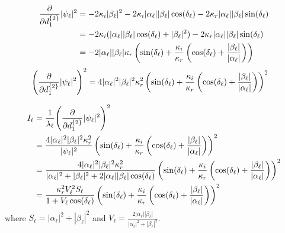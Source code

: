 \documentclass[12pt]{article}
\begin{document}
\begin{align*}
    \pdv{d^{\{2\}}_1} |\psi_\ell|^2 &= 
    -2\kappa_i |\beta_\ell|^2 
    - 2\kappa_i|\alpha_\ell||\beta_\ell|\cos(\delta_\ell) 
    - 2\kappa_r |\alpha_\ell||\beta_\ell|\sin(\delta_\ell)\\
    &= -2\kappa_i(|\alpha_\ell||\beta_\ell|\cos(\delta_\ell) + |\beta_\ell|^2) 
    - 2\kappa_r |\alpha_\ell||\beta_\ell|\sin(\delta_\ell)\\
    &= -2|\alpha_\ell||\beta_\ell|\kappa_r \left(
        \sin(\delta_\ell) + \frac{\kappa_i}{\kappa_r} \left(\cos(\delta_\ell) + \frac{|\beta_\ell|}{|\alpha_\ell|}\right)  
    \right)
\end{align*}
\begin{align*}
    \left( \pdv{d^{\{2\}}_1} |\psi_\ell|^2 \right)^2 &=
    4|\alpha_\ell|^2|\beta_\ell|^2\kappa_r^2 \left(
        \sin(\delta_\ell) + \frac{\kappa_i}{\kappa_r} \left(\cos(\delta_\ell) + \frac{|\beta_\ell|}{|\alpha_\ell|}\right)  
    \right)^2   
\end{align*}

\begin{align*}
    I_\ell &= \frac{1}{\lambda_\ell} \qty(\pdv{d^{\{2\}}_1} |\psi_\ell|^2)^2 \\
    &= \frac{4|\alpha_\ell|^2|\beta_\ell|^2\kappa_r^2}{|\psi_\ell|^2} 
    \left(
        \sin(\delta_\ell) + \frac{\kappa_i}{\kappa_r} \left(\cos(\delta_\ell) + \frac{|\beta_\ell|}{|\alpha_\ell|}\right)  
    \right)^2\\
    &= \frac{4|\alpha_\ell|^2|\beta_\ell|^2\kappa_r^2}{|\alpha_\ell|^2 + |\beta_\ell|^2 + 2|\alpha_\ell||\beta_\ell|\cos(\delta_\ell)} \left(
        \sin(\delta_\ell) + \frac{\kappa_i}{\kappa_r} 
        \left(\cos(\delta_\ell) + \frac{|\beta_\ell|}{|\alpha_\ell|}\right) 
    \right)^2\\
    &= \frac{\kappa_r^2 V_\ell^2 S_\ell}{ 1 + V_\ell \cos(\delta_\ell)}
     \left(
        \sin(\delta_\ell) + \frac{\kappa_i}{\kappa_r} 
        \left(\cos(\delta_\ell) + \frac{|\beta_\ell|}{|\alpha_\ell|}\right) 
    \right)^2
\end{align*}
where $S_\ell = |\alpha_\ell|^2 + |\beta_\ell|^2$ and $V_\ell = \frac{2|\alpha_\ell||\beta_\ell|}{|\alpha_\ell|^2 + |\beta_\ell|^2}$.
\end{document}
